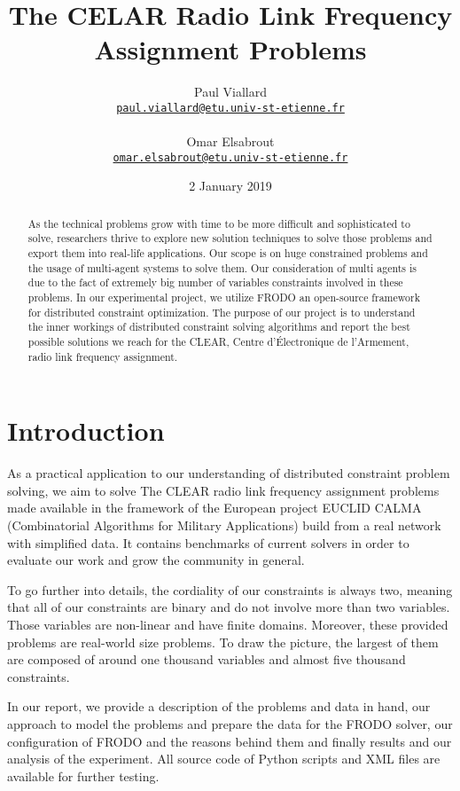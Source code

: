 \documentclass{article}
\title{The CELAR Radio Link Frequency Assignment Problems}
\author{Paul Viallard\\
	\texttt{\href{mailto:paul.viallard@etu.univ-st-etienne.fr}{paul.viallard@etu.univ-st-etienne.fr}} 
	\\\\ Omar Elsabrout\\
	\texttt{\href{mailto:omar.elsabrout@etu.univ-st-etienne.fr}{omar.elsabrout@etu.univ-st-etienne.fr}}}
\date{2 January 2019}
\begin{document}
	\maketitle
	
	\begin{abstract}
		As the technical problems grow with time to be more difficult and sophisticated to solve, researchers thrive to explore new solution techniques to solve those problems and export them into real-life applications. Our scope is on huge constrained problems and the usage of multi-agent systems to solve them. Our consideration of multi agents is due to the fact of extremely big number of variables constraints involved in these problems. In our experimental project, we utilize FRODO\cite{FRODO} an open-source framework for distributed constraint optimization. The purpose of our project is to understand the inner workings of distributed constraint solving algorithms and report the best possible solutions we reach for the CLEAR, Centre d’Électronique de l’Armement, radio link frequency assignment.
	\end{abstract}
	
	\section{Introduction}
	As a practical application to our understanding of distributed constraint problem solving, we aim to solve The CLEAR radio link frequency assignment problems made available in the framework of the European project EUCLID CALMA (Combinatorial Algorithms for Military Applications) build from a real network with simplified data. It contains benchmarks of current solvers in order to evaluate our work and grow the community in general.
	
	To go further into details, the cordiality of our constraints is always two, meaning that all of our constraints are binary and do not involve more than two variables. Those variables are non-linear and have finite domains. Moreover, these provided problems are real-world size problems. To draw the picture, the largest of them are composed of around one thousand variables and almost five thousand constraints.
	
	In our report, we provide a description of the problems and data in hand, our approach to model the problems and prepare the data for the FRODO solver, our configuration of FRODO and the reasons behind them and finally results and our analysis of the experiment. All source code of Python scripts and XML files are available for further testing.
	
\end{document}

